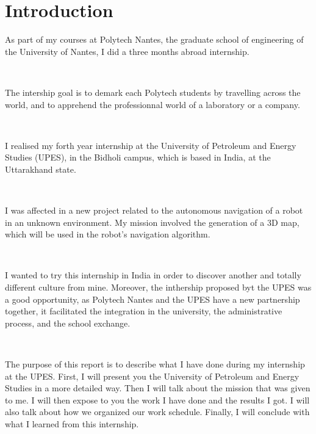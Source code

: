 \chapter{Introduction}

As part of my courses at Polytech Nantes, the graduate school of engineering of the University of Nantes, I did a three months abroad internship. 

~~

The intership goal is to demark each Polytech students by travelling across the world, and to apprehend the professionnal world of a laboratory or a company.

~~

I realised my forth year internship at the University of Petroleum and Energy Studies (UPES), in the Bidholi campus, which is based in India, at the Uttarakhand state.

~~

I was affected in a new project related to the autonomous navigation of a robot in an unknown environment. My mission involved the generation of a 3D map, which will be used in the robot's navigation algorithm.

~~

I wanted to try this internship in India in order to discover another and totally different culture from mine. Moreover, the inthership proposed byt the UPES was a good opportunity, as Polytech Nantes and the UPES have a new partnership together, it facilitated the integration in the university, the administrative process, and the school exchange. 

~~

The purpose of this report is to describe what I have done during my internship at the UPES. First, I will present you the University of Petroleum and Energy Studies in a more detailed way. Then I will talk about the mission that was given to me. I will then expose to you the work I have done and the results I got. I will also talk about how we organized our work schedule. Finally, I will conclude with what I learned from this internship.
